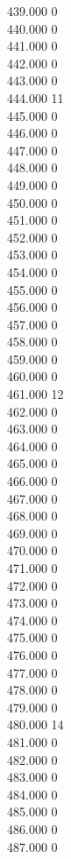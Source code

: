{ 439.000	0 \\
 440.000	0 \\
 441.000	0 \\
 442.000	0 \\
 443.000	0 \\
 444.000	11 \\
 445.000	0 \\
 446.000	0 \\
 447.000	0 \\
 448.000	0 \\
 449.000	0 \\
 450.000	0 \\
 451.000	0 \\
 452.000	0 \\
 453.000	0 \\
 454.000	0 \\
 455.000	0 \\
 456.000	0 \\
 457.000	0 \\
 458.000	0 \\
 459.000	0 \\
 460.000	0 \\
 461.000	12 \\
 462.000	0 \\
 463.000	0 \\
 464.000	0 \\
 465.000	0 \\
 466.000	0 \\
 467.000	0 \\
 468.000	0 \\
 469.000	0 \\
 470.000	0 \\
 471.000	0 \\
 472.000	0 \\
 473.000	0 \\
 474.000	0 \\
 475.000	0 \\
 476.000	0 \\
 477.000	0 \\
 478.000	0 \\
 479.000	0 \\
 480.000	14 \\
 481.000	0 \\
 482.000	0 \\
 483.000	0 \\
 484.000	0 \\
 485.000	0 \\
 486.000	0 \\
 487.000	0 \\
}
